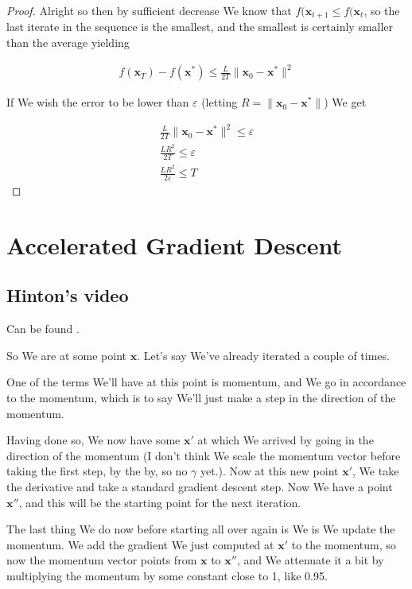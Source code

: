\documentclass{article}
\begin{document}
\begin{proof}
		Alright so then by sufficient decrease We know that $f(\mathbf{x}_{t+1} \le f(\mathbf{x}_t$, so the last iterate in the sequence is the smallest, and the smallest is certainly smaller than the average yielding
		
		\begin{align*}
			f(\mathbf{x}_T) - f(\mathbf{x^*}) \le \frac{L}{2T}\|\mathbf{x}_0 - \mathbf{x}^*\|^2  
		\end{align*}
		
		If We wish the error to be lower than $\varepsilon$ (letting $R = \|\mathbf{x}_0 - \mathbf{x}^*\|$) We get
		
		\begin{align*}
			\frac{L}{2T}\|\mathbf{x}_0 - \mathbf{x}^*\|^2   \le \varepsilon\\
			\frac{LR^2}{2T}   \le \varepsilon\\
			\frac{LR^2}{2\varepsilon}   \le T
		\end{align*}
		
		
		
	\end{proof}


\section{Accelerated Gradient Descent}

	\subsection{Hinton's video}
	
		Can be found \href{https://www.youtube.com/watch?v=LdkkZglLZ0Q}{\color{blue}{here}}.
		
		So We are at some point $\mathbf{x}$. Let's say We've already iterated a couple of times. 
		
		One of the terms We'll have at this point is momentum, and We go in accordance to the momentum, which is to say We'll just make a step in the direction of the momentum.
		
		Having done so, We now have some $\mathbf{x'}$ at which We arrived by going in the direction of the momentum (I don't think We scale the momentum  vector before taking the first step, by the by, so no $\gamma$ yet.). Now at this new point $\mathbf{x'}$, We take the derivative and take a standard gradient descent step. Now We have a point $\mathbf{x''}$, and this will be the starting point for the next iteration.
		
		The last thing We do now before starting all over again is We is We update the momentum. We add the gradient We just computed at $\mathbf{x'}$ to the momentum, so now the momentum vector points from $\mathbf{x}$ to $\mathbf{x''}$, and We attenuate it a bit by multiplying the momentum by some constant close to 1, like 0.95. 
\end{document}
